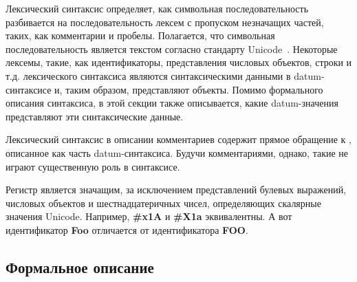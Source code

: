 Лексический синтаксис определяет, как символьная последовательность разбивается на
последовательность лексем с пропуском незначащих частей, таких, как комментарии и
пробелы. Полагается, что символьная последовательность является текстом согласно стандарту
Unicode~\cite{Unicode}. Некоторые лексемы, такие, как идентификаторы, представления числовых
объектов, строки и т.д. лексического синтаксиса являются синтаксическими данными в
datum-синтаксисе и, таким образом, представляют объекты. Помимо формального описания
синтаксиса, в этой секции также описывается, какие datum-значения представляют эти синтаксические
данные.

Лексический синтаксис в описании комментариев содержит прямое обращение к ,
описанное как часть datum-синтаксиса. Будучи комментариями, однако,
такие  не играют существенную роль в синтаксисе.

Регистр является значащим, за исключением представлений булевых выражений, числовых объектов и
шестнадцатеричных чисел, определяющих скалярные значения Unicode. Например, {\cf\bfseries \#x1A}
и {\cf\bfseries \#X1a} эквивалентны. А вот идентификатор {\cf\bfseries Foo} отличается от
идентификатора {\cf\bfseries FOO}.

\subsection{Формальное описание}
\label{lexicalgrammarsection}

